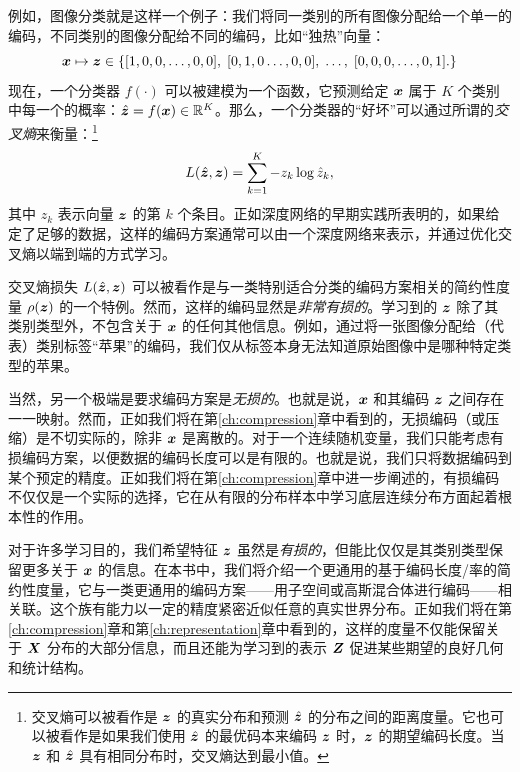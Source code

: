 \documentclass[../../book-main.tex]{subfiles}
\begin{document}
\begin{example}
例如，图像分类就是这样一个例子：我们将同一类别的所有图像分配给一个单一的编码，不同类别的图像分配给不同的编码，比如“独热”向量：
\begin{equation}
  \bm{x} \mapsto \bm{z} \in \{  [1, 0, 0, \ldots , 0, 0], \;  [0, 1, 0 \ldots, 0, 0], \; \ldots, \;  [0,0,0, \ldots, 0, 1].\}
  \label{eqn:class-labels}
\end{equation}
现在，一个分类器 $f(\cdot)$ 可以被建模为一个函数，它预测给定 $\bm{x}$ 属于 $K$ 个类别中每一个的概率：$\hat{\bm{z}} = f(\bm{x}) \in \mathbb{R}^K$。那么，一个分类器的“好坏”可以通过所谓的{\em 交叉熵}来衡量：\footnote{交叉熵可以被看作是 $\bm{z}$ 的真实分布和预测 $\hat{\bm{z}}$ 的分布之间的距离度量。它也可以被看作是如果我们使用 $\hat {\bm{z}}$ 的最优码本来编码 $\bm{z}$ 时，$\bm{z}$ 的期望编码长度。当 $\bm{z}$ 和 $\hat {\bm{z}}$ 具有相同分布时，交叉熵达到最小值。}
\begin{equation}
    L(\hat{\bm{z}}, \bm{z}) = \sum_{k=1}^K - z_k \log \hat{z}_k,
\end{equation}
其中 $z_k$ 表示向量 $\bm{z}$ 的第 $k$ 个条目。正如深度网络的早期实践所表明的\cite{krizhevsky2012imagenet}，如果给定了足够的数据，这样的编码方案通常可以由一个深度网络来表示，并通过优化交叉熵以端到端的方式学习。
\end{example}

交叉熵损失 $L(\hat {\bm{z}}, \bm{z})$ 可以被看作是与一类特别适合分类的编码方案相关的简约性度量 $\rho(\bm{z})$ 的一个特例。然而，这样的编码显然是{\em 非常有损的}。学习到的 $\bm{z}$ 除了其类别类型外，不包含关于 $\bm{x}$ 的任何其他信息。例如，通过将一张图像分配给（代表）类别标签“苹果”的编码，我们仅从标签本身无法知道原始图像中是哪种特定类型的苹果。

当然，另一个极端是要求编码方案是{\em 无损的}。也就是说，$\bm{x}$ 和其编码 $\bm{z}$ 之间存在一一映射。然而，正如我们将在第\ref{ch:compression}章中看到的，无损编码（或压缩）是不切实际的，除非 $\bm{x}$ 是离散的。对于一个连续随机变量，我们只能考虑有损编码方案，以便数据的编码长度可以是有限的。也就是说，我们只将数据编码到某个预定的精度。正如我们将在第\ref{ch:compression}章中进一步阐述的，有损编码不仅仅是一个实际的选择，它在从有限的分布样本中学习底层连续分布方面起着根本性的作用。

对于许多学习目的，我们希望特征 $\bm{z}$ 虽然是{\em 有损的}，但能比仅仅是其类别类型保留更多关于 $\bm{x}$ 的信息。在本书中，我们将介绍一个更通用的基于编码长度/率的简约性度量，它与一类更通用的编码方案——用子空间或高斯混合体进行编码——相关联。这个族有能力以一定的精度紧密近似任意的真实世界分布。正如我们将在第\ref{ch:compression}章和第\ref{ch:representation}章中看到的，这样的度量不仅能保留关于 $\bm{X}$ 分布的大部分信息，而且还能为学习到的表示 $\bm{Z}$ 促进某些期望的良好几何和统计结构。
\end{document}
